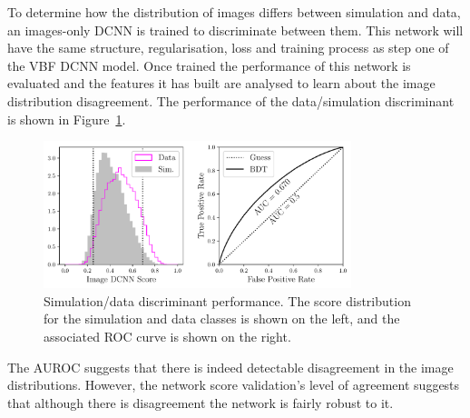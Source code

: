 To determine how the distribution of images differs between simulation and data, an images-only DCNN is trained to discriminate between them.
This network will have the same structure, regularisation, loss and training process as step one of the VBF DCNN model. 
Once trained the performance of this network is evaluated and the features it has built are analysed to learn about the image distribution disagreement.  
The performance of the data/simulation discriminant is shown in Figure~\ref{fig:event_categorisation:zee_disc_perf}.
\begin{figure}[h!]
    \centering
    \includegraphics[width=0.8\textwidth]{figures/event_selection/ROC_Zee_img_DCNN.pdf}
    \caption{\Zee Simulation/data discriminant performance. The score distribution for the simulation and data classes is shown on the left, and the associated ROC curve is shown on the right.} 
    \label{fig:event_categorisation:zee_disc_perf}
\end{figure}

The AUROC suggests that there is indeed detectable disagreement in the image distributions. 
However, the network score validation's level of agreement suggests that although there is disagreement the network is fairly robust to it. 

